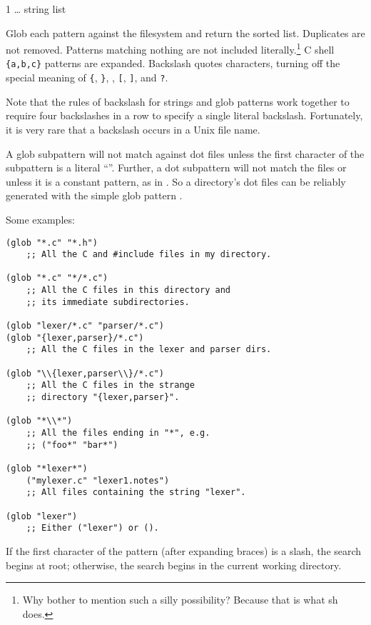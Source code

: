  {1 \ldots} {string list}
\begin{desc}
    Glob each pattern against the filesystem and return the sorted list. 
    Duplicates are not removed. Patterns matching nothing are not included 
    literally.\footnote{Why bother to mention such a silly possibility?
    Because that is what sh does.}
    C shell \verb|{a,b,c}| patterns are expanded. Backslash quotes 
    characters, turning off the special meaning of
    \verb|{|, \verb|}|, \cd{*}, \verb|[|, \verb|]|, and \verb|?|. 

    Note that the rules of backslash for {\Scheme} strings and glob patterns
    work together to require four backslashes in a row to specify a
    single literal backslash. Fortunately, it is very rare that a backslash
    occurs in a Unix file name.

    A glob subpattern will not match against dot files unless the first
    character of the subpattern is a literal ``''. 
    Further, a dot subpattern will not match the files  or  
    unless it is a constant pattern, as in .
    So a directory's dot files can be reliably generated
    with the simple glob pattern .

    Some examples:
\begin{inset}
\begin{verbatim}    
(glob "*.c" "*.h")
    ;; All the C and #include files in my directory.

(glob "*.c" "*/*.c")
    ;; All the C files in this directory and 
    ;; its immediate subdirectories.

(glob "lexer/*.c" "parser/*.c")
(glob "{lexer,parser}/*.c")
    ;; All the C files in the lexer and parser dirs.

(glob "\\{lexer,parser\\}/*.c")
    ;; All the C files in the strange 
    ;; directory "{lexer,parser}".

(glob "*\\*")
    ;; All the files ending in "*", e.g.
    ;; ("foo*" "bar*")         

(glob "*lexer*")
    ("mylexer.c" "lexer1.notes") 
    ;; All files containing the string "lexer".

(glob "lexer")
    ;; Either ("lexer") or ().\end{verbatim}
\end{inset}
%    
If the first character of the pattern (after expanding braces) is a slash,
the search begins at root; otherwise, the search begins in the current
working directory.


\end{desc}
